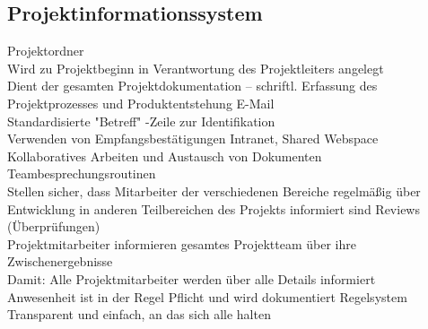 \documentclass[a4paper, 12pt]{article}
\begin{document}
\subsection{Projektinformationssystem}
Projektordner 
\\
Wird zu Projektbeginn in Verantwortung des Projektleiters angelegt
\\
Dient der gesamten Projektdokumentation – schriftl. Erfassung des Projektprozesses und Produktentstehung E-Mail
\\
Standardisierte "Betreff" -Zeile zur Identifikation 
\\
Verwenden von Empfangsbestätigungen Intranet, Shared Webspace 
\\
Kollaboratives Arbeiten und Austausch von Dokumenten\\
Teambesprechungsroutinen 
\\
Stellen sicher, dass Mitarbeiter der verschiedenen Bereiche regelmäßig über Entwicklung in anderen Teilbereichen des Projekts informiert sind Reviews (Überprüfungen)
\\
Projektmitarbeiter informieren gesamtes Projektteam über ihre Zwischenergebnisse 
\\
Damit: Alle Projektmitarbeiter werden über alle Details informiert
\\
Anwesenheit ist in der Regel Pflicht und wird dokumentiert Regelsystem
\\
Transparent und einfach, an das sich alle halten 
\newpage


\end{document}
